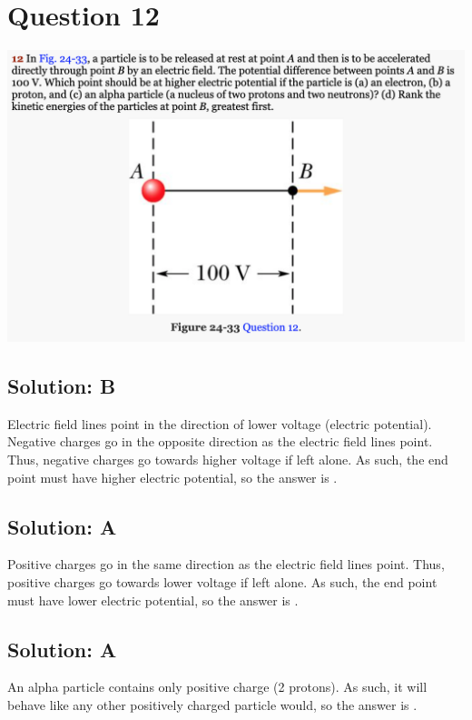 \documentclass[12pt]{article}
\begin{document}
\section{Question 12}
\includegraphics[width=\textwidth]{picture_5.png}

\subsection{Solution: B}
Electric field lines point in the direction of lower voltage (electric potential).
Negative charges go in the opposite direction as the electric field lines point.
Thus, negative charges go towards higher voltage if left alone.
As such, the end point must have higher electric potential, so the answer is .

\subsection{Solution: A}
Positive charges go in the same direction as the electric field lines point.
Thus, positive charges go towards lower voltage if left alone.
As such, the end point must have lower electric potential, so the answer is .

\subsection{Solution: A}
An alpha particle contains only positive charge (2 protons). 
As such, it will behave like any other positively charged particle would, so the answer is .
\end{document}
